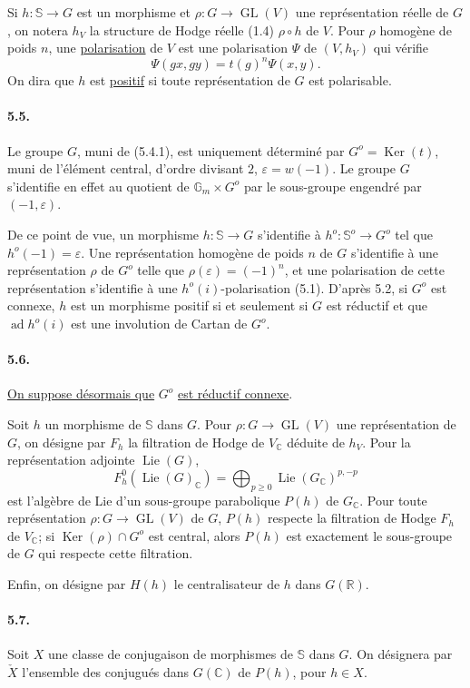\documentclass[10pt,leqno]{article}
\newcommand{\C}{\mathbb C}
\newcommand{\R}{\mathbb R}
\newcommand{\bS}{\mathbb S}
\newcommand{\Ker}{\operatorname{Ker}}
\theoremstyle{deligne}
\newcommand{\Lie}{\operatorname{Lie}}
\newcommand{\ad}{\operatorname{ad}}
\newcommand{\GL}{\operatorname{GL}}
\renewcommand{\underline}[1]{\uline{#1}}
\begin{document}
Si $h:\bS\to G$ est un morphisme et $\rho:G\to\GL(V)$ une représentation réelle de $G$, on notera $h_V$ la structure de Hodge réelle (1.4) $\rho\circ h$ de $V$. Pour $\rho$ homogène de poids $n$, une \underline{polarisation} de $V$ est une polarisation $\Psi$ de $(V,h_V)$ qui vérifie
\[
\tag{5.4.2}
  \Psi(gx,gy)=t(g)^n\Psi(x,y).
\]
On dira que $h$ est \underline{positif} si toute représentation de $G$ est polarisable.

\paragraph{5.5.}
Le groupe $G$, muni de (5.4.1), est uniquement déterminé par $G^o=\Ker(t)$, muni de l'élément central, d'ordre divisant $2$, $\varepsilon=w(-1)$. Le groupe $G$ s'identifie en effet au quotient de $\mathbb G_m\times G^o$ par le sous-groupe engendré par $(-1,\varepsilon)$.

De ce point de vue, un morphisme $h:\bS\to G$ s'identifie à $h^o:\bS^o\to G^o$ tel que $h^o(-1)=\varepsilon$. Une représentation homogène de poids $n$ de $G$ s'identifie à une représentation $\rho$ de $G^o$ telle que $\rho(\varepsilon)=(-1)^n$, et une polarisation de cette représentation s'identifie à une $h^o(i)$-polarisation (5.1). D'après 5.2, si $G^o$ est connexe, $h$ est un morphisme positif si et seulement si $G$ est réductif et que $\ad h^o(i)$ est une involution de Cartan de $G^o$.

\paragraph{5.6.}
\underline{On suppose désormais que} $G^o$ \underline{est réductif connexe}.

Soit $h$ un morphisme de $\bS$ dans $G$. Pour $\rho:G\to\GL(V)$ une représentation de $G$, on désigne par $F_h$ la filtration de Hodge de $V_\C$ déduite de $h_V$. Pour la représentation adjointe $\Lie(G)$,
\[
\tag{5.6.1}
  F_h^0(\Lie(G)_\C)=\bigoplus_{p\ge0}\Lie(G_\C)^{p,-p}
\]
est l'algèbre de Lie d'un sous-groupe parabolique $P(h)$ de $G_\C$. Pour toute représentation $\rho:G\to\GL(V)$ de $G$, $P(h)$ respecte la filtration de Hodge $F_h$ de $V_\C$; si $\Ker(\rho)\cap G^o$ est central, alors $P(h)$ est exactement le sous-groupe de $G$ qui respecte cette filtration.

Enfin, on désigne par $H(h)$ le centralisateur de $h$ dans $G(\R)$.

\paragraph{5.7.}
Soit $X$ une classe de conjugaison de morphismes de $\bS$ dans $G$. On désignera par $\check X$ l'ensemble des conjugués dans $G(\C)$ de $P(h)$, pour $h\in X$.
\end{document}
